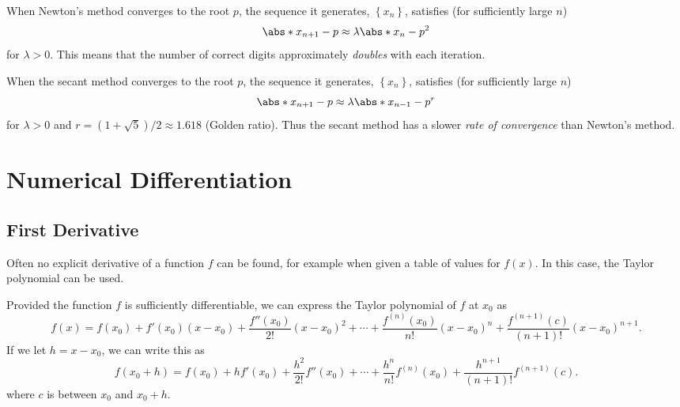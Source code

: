 \documentclass{article}
\begin{document}
When Newton's method converges to the root \(p\), the sequence it generates, \(\left\{ x_n \right\}\), satisfies (for sufficiently large \(n\))
\begin{equation*}
    \abs*{x_{n + 1} - p} \approx \lambda \abs*{x_n - p}^2
\end{equation*}
for \(\lambda > 0\). This means that the number of correct digits approximately \textit{doubles} with each iteration.

When the secant method converges to the root \(p\), the sequence it generates, \(\left\{ x_n \right\}\), satisfies (for sufficiently large \(n\))
\begin{equation*}
    \abs*{x_{n + 1} - p} \approx \lambda \abs*{x_{n - 1} - p}^r
\end{equation*}
for \(\lambda > 0\) and \(r = \left( 1 + \sqrt{5} \right)/2 \approx 1.618\) (Golden ratio).
Thus the secant method has a slower \textit{rate of convergence} than Newton's method.
\section{Numerical Differentiation}
\subsection{First Derivative}
Often no explicit derivative of a function \(f\) can be found, for example when given a table of
values for \(f\left( x \right)\). In this case, the Taylor polynomial can be used.

Provided the function \(f\) is sufficiently differentiable, we can express the Taylor polynomial of \(f\) at \(x_0\) as
\begin{equation*}
    f\left( x \right) = f\left( x_0 \right) + f'\left( x_0 \right) \left( x - x_0 \right) + \frac{f''\left( x_0 \right)}{2!} \left( x - x_0 \right)^2 + \cdots + \frac{f^{\left( n \right)}\left( x_0 \right)}{n!} \left( x - x_0 \right)^n + \frac{f^{\left( n + 1 \right)}\left( c \right)}{\left( n + 1 \right)!} \left( x - x_0 \right)^{n + 1}.
\end{equation*}
If we let \(h = x - x_0\), we can write this as
\begin{equation*}
    f\left( x_0 + h \right) = f\left( x_0 \right) + h f'\left( x_0 \right) + \frac{h^2}{2!} f''\left( x_0 \right) + \cdots + \frac{h^n}{n!} f^{\left( n \right)}\left( x_0 \right) + \frac{h^{n + 1}}{\left( n + 1 \right)!} f^{\left( n + 1 \right)}\left( c \right).
\end{equation*}
where \(c\) is between \(x_0\) and \(x_0 + h\).
\end{document}
